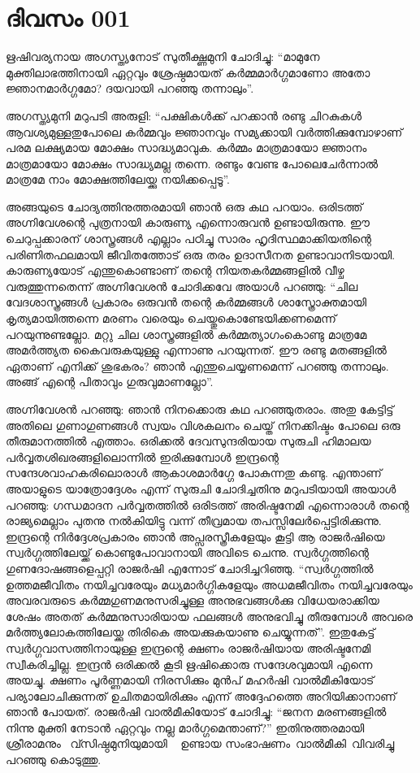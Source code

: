 \section{ദിവസം 001}

ഋഷിവര്യനായ അഗസ്ത്യനോട്‌ സുതീക്ഷ്ണമുനി ചോദിച്ചു: ``മാമുനേ
മുക്തിലാഭത്തിനായി ഏറ്റവും ശ്രേഷ്ഠമായത്‌ കര്‍മ്മമാര്‍ഗ്ഗമാണോ അതോ
ജ്ഞാനമാര്‍ഗ്ഗമോ? ദയവായി പറഞ്ഞു തന്നാലും''.

അഗസ്ത്യമുനി മറുപടി അരുളി: ``പക്ഷികള്‍ക്ക്‌ പറക്കാന്‍ രണ്ടു ചിറകുകള്‍
ആവശ്യമുള്ളതുപോലെ കര്‍മ്മവും ജ്ഞാനവും സമ്യക്കായി വര്‍ത്തിക്കുമ്പോഴാണ്‌
പരമ ലക്ഷ്യമായ മോക്ഷം സാദ്ധ്യമാവുക. കര്‍മ്മം മാത്രമായോ ജ്ഞാനം മാത്രമായോ
മോക്ഷം സാദ്ധ്യമല്ല തന്നെ. രണ്ടും വേണ്ട പോലെചേര്‍ന്നാല്‍ മാത്രമേ നാം
മോക്ഷത്തിലേയ്ക്കു നയിക്കപ്പെടൂ''.~

അങ്ങയുടെ ചോദ്യത്തിനുത്തരമായി ഞാന്‍ ഒരു കഥ പറയാം. ഒരിടത്ത്‌ അഗ്നിവേശന്റെ
പുത്രനായി കാരുണ്യ എന്നൊരുവന്‍ ഉണ്ടായിരുന്നു. ഈ ചെറുപ്പക്കാരന്‌
ശാസ്ത്രങ്ങള്‍ എല്ലാം പഠിച്ചു സാരം ഹൃദിസ്ഥമാക്കിയതിന്റെ പരിണിതഫലമായി
ജീവിതത്തോട്‌ ഒരു തരം ഉദാസീനത ഉണ്ടാവാനിടയായി. കാരുണ്യയോട്‌ എന്തുകൊണ്ടാണ്‌
തന്റെ നിയതകര്‍മ്മങ്ങളില്‍ വീഴ്ച വരുത്തുന്നതെന്ന് അഗ്നിവേശന്‍ ചോദിക്കവേ
അയാള്‍ പറഞ്ഞു: ``ചില വേദശാസ്ത്രങ്ങള്‍ പ്രകാരം ഒരുവന്‍ തന്റെ
കര്‍മ്മങ്ങള്‍ ശാസ്ത്രോക്തമായി കൃത്യമായിത്തന്നെ മരണം വരെയും
ചെയ്തുകൊണ്ടേയിക്കണമെന്ന് പറയുന്നുണ്ടല്ലോ. മറ്റു ചില ശാസ്ത്രങ്ങളില്‍
കര്‍മ്മത്യാഗംകൊണ്ടു മാത്രമേ അമര്‍ത്ത്യത കൈവരുകയുള്ളു എന്നാണു പറയുന്നത്‌.
ഈ രണ്ടു മതങ്ങളില്‍ ഏതാണ്‌ എനിക്ക്‌ ശുഭകരം? ഞാന്‍ എന്തുചെയ്യണമെന്ന്
പറഞ്ഞു തന്നാലും. അങ്ങ്‌ എന്റെ പിതാവും ഗുരുവുമാണല്ലോ''.

അഗ്നിവേശന്‍ പറഞ്ഞു: ഞാന്‍ നിനക്കൊരു കഥ പറഞ്ഞുതരാം. അതു കേട്ടിട്ട്‌ അതിലെ
ഗുണാഗുണങ്ങള്‍ സ്വയം വിശകലനം ചെയ്ത്‌ നിനക്കിഷ്ടം പോലെ ഒരു തീരുമാനത്തില്‍
എത്താം. ഒരിക്കല്‍ ദേവസുന്ദരിയായ സുരുചി ഹിമാലയ പര്‍വ്വതശിഖരങ്ങളിലൊന്നില്‍
ഇരിക്കുമ്പോള്‍ ഇന്ദ്രന്റെ സന്ദേശവാഹകരിലൊരാള്‍ ആകാശമാര്‍ഗ്ഗേ പോകുന്നതു
കണ്ടു. എന്താണ്‌ അയാളുടെ യാത്രോദ്ദേശം എന്ന് സുരുചി ചോദിച്ചതിനു മറുപടിയായി
അയാള്‍ പറഞ്ഞു: ഗന്ധമാദന പര്‍വ്വതത്തില്‍ ഒരിടത്ത്‌ അരിഷ്ടനേമി എന്നൊരാള്‍
തന്റെ രാജ്യമെല്ലാം പുതനു നല്‍കിയിട്ടു വന്ന് തീവ്രമായ
തപസ്സിലേര്‍പ്പെട്ടിരിക്കുന്നു. ഇന്ദ്രന്റെ നിര്‍ദ്ദേശപ്രകാരം ഞാന്‍
അപ്സരസ്ത്രീകളേയും കൂട്ടി ആ രാജര്‍ഷിയെ സ്വര്‍ഗ്ഗത്തിലേയ്ക്ക്‌
കൊണ്ടുപോവാനായി അവിടെ ചെന്നു. സ്വര്‍ഗ്ഗത്തിന്റെ ഗുണദോഷങ്ങളെപ്പറ്റി
രാജര്‍ഷി എന്നോട്‌ ചോദിച്ചറിഞ്ഞു. ``സ്വര്‍ഗ്ഗത്തില്‍ ഉത്തമജീവിതം
നയിച്ചവരേയും മധ്യമാര്‍ഗ്ഗികളേയും അധമജീവിതം നയിച്ചവരേയും അവരവരുടെ
കര്‍മ്മഗുണമനുസരിച്ചുള്ള അനുഭവങ്ങള്‍ക്കു വിധേയരാക്കിയ ശേഷം അതത്‌
കര്‍മ്മനുസാരിയായ ഫലങ്ങള്‍ അനുഭവിച്ചു തീരുമ്പോള്‍ അവരെ
മര്‍ത്ത്യലോകത്തിലേയ്ക്കു തിരികെ അയക്കുകയാണു ചെയ്യുന്നത്‌''. ഇതുകേട്ട്‌
സ്വര്‍ഗ്ഗവാസത്തിനായുള്ള ഇന്ദ്രന്റെ ക്ഷണം രാജര്‍ഷിയായ അരിഷ്ടനേമി
സ്വീകരിച്ചില്ല. ഇന്ദ്രന്‍ ഒരിക്കല്‍ കൂടി ഋഷിക്കൊരു സന്ദേശവുമായി എന്നെ
അയച്ചു. ക്ഷണം പൂര്‍ണ്ണമായി നിരസിക്കും മുന്‍പ്‌ മഹര്‍ഷി വാല്‍മീകിയോട്‌
പര്യാലോചിക്കുന്നത്‌ ഉചിതമായിരിക്കും എന്ന് അദ്ദേഹത്തെ അറിയിക്കാനാണ്‌
ഞാന്‍ പോയത്‌. രാജര്‍ഷി വാല്‍മീകിയോട്‌ ചോദിച്ചു: ``ജനന മരണങ്ങളില്‍ നിന്നു
മുക്തി നേടാന്‍ ഏറ്റവും നല്ല മാര്‍ഗ്ഗമെന്താണ്‌?'' ഇതിനുത്തരമായി
ശ്രീരാമനും ~വ്സിഷ്ഠമുനിയുമായി ~ ഉണ്ടായ സംഭാഷണം~വാല്‍മീകി~വിവരിച്ചു
പറഞ്ഞു കൊടുത്തു.

